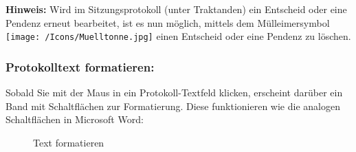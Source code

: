 \vspace{\baselineskip}

\textbf{Hinweis:} Wird im Sitzungsprotokoll (unter Traktanden) ein Entscheid oder eine Pendenz erneut bearbeitet, ist es nun möglich, mittels dem Mülleimersymbol \texttt{[image: /Icons/Muelltonne.jpg]} einen Entscheid oder eine Pendenz zu löschen.

\subsubsection{Protokolltext formatieren:}

Sobald Sie mit der Maus in ein Protokoll-Textfeld klicken, erscheint darüber ein Band mit Schaltflächen  zur Formatierung. Diese funktionieren wie die analogen Schaltflächen in Microsoft Word:

\begin{figure}[H]
\caption{Text formatieren}
\end{figure}

